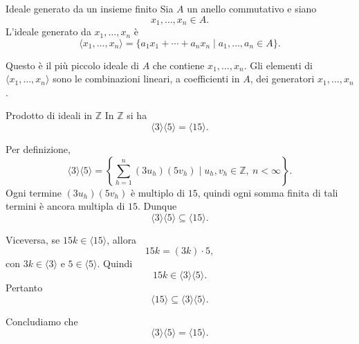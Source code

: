 \documentclass[a4paper]{article}
\begin{document}
\begin{radioactive}
\begin{snippetdefinition}{Ideale generato da un insieme finito}
    Sia \(A\) un anello commutativo e siano
    \[
        x_1,\ldots,x_n\in A.
    \]
    L'ideale generato da \(x_1,\ldots,x_n\) è
    \[
        \langle x_1,\ldots,x_n \rangle
        =
        \{a_1x_1+\cdots+a_nx_n\mid a_1,\ldots,a_n\in A\}.
    \]
\end{snippetdefinition}
\end{radioactive}

\begin{radioactive}
Questo è il più piccolo ideale di \(A\) che contiene \(x_1,\ldots,x_n\). Gli elementi di \(\langle x_1,\ldots,x_n \rangle\) sono le combinazioni lineari, a coefficienti in \(A\), dei generatori \(x_1,\ldots,x_n\).
\end{radioactive}

\begin{radioactive}
\begin{snippetexample}{Prodotto di ideali in \(\mathbb{Z}\)}
    In \(\mathbb{Z}\) si ha
    \[
        \langle 3 \rangle\langle 5 \rangle=\langle 15 \rangle.
    \]
\end{snippetexample}
\end{radioactive}

\begin{radioactive}
\begin{snippetproof}{}
    Per definizione,
    \[
        \langle 3 \rangle\langle 5 \rangle
        =
        \left\{
            \sum_{h=1}^n (3u_h)(5v_h)
            \mid
            u_h,v_h\in\mathbb{Z},\ n<\infty
        \right\}.
    \]
    Ogni termine \((3u_h)(5v_h)\) è multiplo di \(15\), quindi ogni somma finita di tali termini è ancora multipla di \(15\). Dunque
    \[
        \langle 3 \rangle\langle 5 \rangle\subseteq \langle 15 \rangle.
    \]

    Viceversa, se \(15k\in\langle 15 \rangle\), allora
    \[
        15k=(3k)\cdot 5,
    \]
    con \(3k\in\langle 3 \rangle\) e \(5\in\langle 5 \rangle\). Quindi
    \[
        15k\in \langle 3 \rangle\langle 5 \rangle.
    \]
    Pertanto
    \[
        \langle 15 \rangle\subseteq \langle 3 \rangle\langle 5 \rangle.
    \]

    Concludiamo che
    \[
        \langle 3 \rangle\langle 5 \rangle=\langle 15 \rangle.
    \]
\end{snippetproof}
\end{radioactive}
\end{document}
